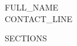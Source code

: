 \newcommand{\resumeEducationSubheading}[4]{\resumeSubheading{#1}{#2}{#3}{#4}}

\renewcommand\labelitemi{$\vcenter{\hbox{\tiny$\bullet$}}$}
\renewcommand\labelitemii{$\vcenter{\hbox{\tiny$\bullet$}}$}

\newcommand{\resumeSubHeadingListStart}{\begin{itemize}[leftmargin=0.0in, label={}]}
\newcommand{\resumeSubHeadingListEnd}{\end{itemize}}
\newcommand{\resumeItemListStart}{\begin{itemize}}
\newcommand{\resumeItemListEnd}{\end{itemize}\vspace{-5pt}}



\begin{center}
    {\Huge \scshape {{FULL_NAME}}} \\ \vspace{4pt}
    \small {{CONTACT_LINE}}
    \vspace{-8pt}
\end{center}
\par\vspace{1pt}

{{SECTIONS}}


